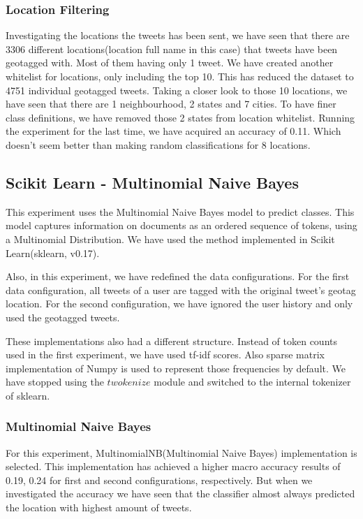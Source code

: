 \documentclass[twoside,11pt]{article}
\begin{document}
\subsubsection{Location Filtering}
Investigating the locations the tweets has been sent, we have seen that there are 3306 different locations(location full name in this case) that tweets have been geotagged with. Most of them having only 1 tweet. We have created another whitelist for locations, only including the top 10. This has reduced the dataset to 4751 individual geotagged tweets. Taking a closer look to those 10 locations, we have seen that there are 1 neighbourhood, 2 states and 7 cities. To have finer class definitions, we have removed those 2 states from location whitelist. Running the experiment for the last time, we have acquired an accuracy of 0.11. Which doesn't seem better than making random classifications for 8 locations.

\subsection{Scikit Learn - Multinomial Naive Bayes}
This experiment uses the Multinomial Naive Bayes model to predict classes. This model captures information on documents as an ordered sequence of tokens\cite{mccallum1998comparison}, using a Multinomial Distribution. We have used the method implemented in Scikit Learn\cite{scikit-learn}(sklearn, v0.17).

Also, in this experiment, we have redefined the data configurations. For the first data configuration, all tweets of a user are tagged with the original tweet's geotag location.  For the second configuration, we have ignored the user history and only used the geotagged tweets.

These implementations also had a different structure. Instead of token counts used in the first experiment, we have used tf-idf scores. Also sparse matrix implementation of Numpy is used to represent those frequencies by default. We have stopped using the $twokenize$ module and switched to the internal tokenizer of sklearn.

\subsubsection{Multinomial Naive Bayes}

For this experiment, MultinomialNB(Multinomial Naive Bayes) implementation is selected. This implementation has achieved a higher macro accuracy results of 0.19, 0.24 for first and second configurations, respectively. But when we investigated the accuracy we have seen that the classifier almost always predicted the location with highest amount of tweets.
\end{document}
